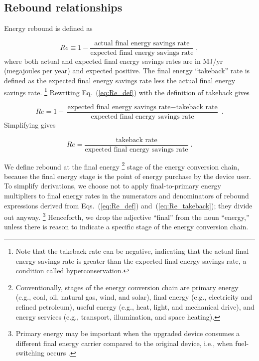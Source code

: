 \documentclass[12pt]{article}\usepackage[]{graphicx}\usepackage[]{xcolor}
\begin{document}
\subsection{Rebound relationships}
\label{sec:rebound_relationships}

Energy rebound is defined as

\begin{equation} \label{eq:Re_def}
  Re \equiv 1 - \frac{\text{actual final energy savings rate}}{\text{expected final energy savings rate}} \; ,
\end{equation}
%
where both actual and expected final energy savings rates are in MJ/yr (megajoules per year)
and expected positive.
The final energy ``takeback'' rate is defined as the expected final energy savings rate less 
the actual final energy savings rate.%
\footnote{
  Note that the takeback rate can be negative, 
  indicating that the actual final energy savings rate
  is greater than the expected final energy savings rate, 
  a condition called hyperconservation.
}
%
Rewriting Eq.~(\ref{eq:Re_def}) with the definition of takeback gives

\begin{equation}
  Re = 1 - \frac{\text{expected final energy savings rate} - \text{takeback rate}}{\text{expected final energy savings rate}} \; .
\end{equation}
%
Simplifying gives

\begin{equation} \label{eq:Re_takeback}
  Re = \frac{\text{takeback rate}}{\text{expected final energy savings rate}} \; .
\end{equation}

We define rebound at the final energy%
\footnote{
  Conventionally, stages of the energy conversion chain are 
  primary energy (e.g., coal, oil, natural gas, wind, and solar),
  final energy (e.g., electricity and refined petroleum),  
  useful energy (e.g., heat, light, and mechanical drive), and 
  energy services (e.g., transport, illumination, and space heating).
}
%
stage of the energy conversion chain,
because the final energy stage is
the point of energy purchase by the device user.
To simplify derivations, 
we choose not to apply final-to-primary energy multipliers
to final energy rates in the numerators and denominators of rebound expressions
derived from Eqs.~(\ref{eq:Re_def}) and~(\ref{eq:Re_takeback});
they divide out anyway.%
\footnote{
  Primary energy may be important when the upgraded device consumes a different 
  final energy carrier
  compared to the original device, 
  i.e., when fuel-switching occurs \citep{Chan2015}.
}
%
Henceforth, we drop the adjective ``final'' 
from the noun ``energy,''
unless there is reason to indicate a specific stage of the energy conversion chain.
\end{document}
